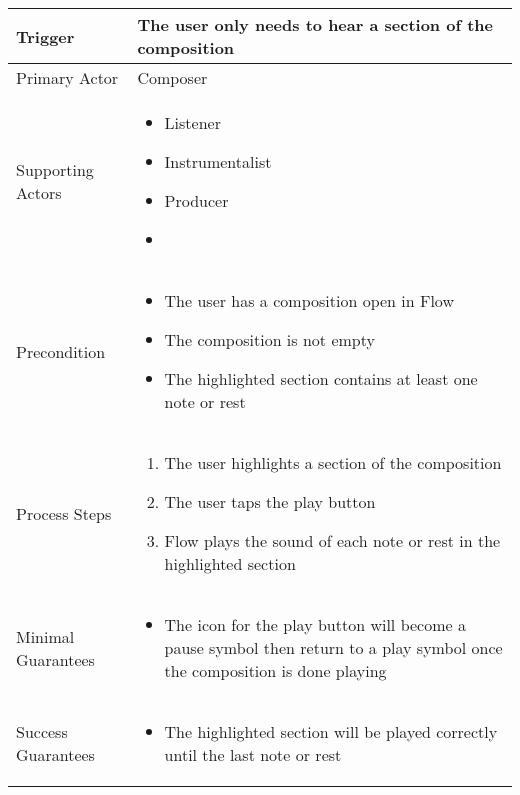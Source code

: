 \begin{longtable}{|X|X|}
\hline
Trigger & 
The user only needs to hear a section of the composition \\
\hline
Primary Actor & 
Composer \\
\hline
Supporting Actors & 
\begin{itemize}
\item Listener
\item Instrumentalist
\item Producer
\item
\end{itemize} \\
\hline
Precondition & 
\begin{itemize}
\item The user has a composition open in Flow
\item The composition is not empty
\item The highlighted section contains at least one note or rest
\end{itemize} \\
\hline
Process Steps & 
\begin{enumerate}
\item The user highlights a section of the composition
\item The user taps the play button
\item Flow plays the sound of each note or rest in the highlighted section
\end{enumerate} \\
\hline
Minimal Guarantees & 
\begin{itemize}
  \item The icon for the play button will become a pause symbol then return to a play symbol once the composition is done playing
\end{itemize} \\
\hline
Success Guarantees & 
\begin{itemize}
  \item The highlighted section will be played correctly until the last note or rest
\end{itemize} \\
\hline
\end{longtable}